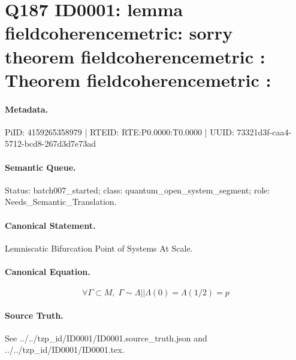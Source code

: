 \section*{Q187 ID0001: lemma fieldcoherencemetric: sorry theorem fieldcoherencemetric : Theorem fieldcoherencemetric :}
\paragraph{Metadata.}
PiID: 4159265358979 | RTEID: RTE:P0.0000:T0.0000 | UUID: 73321d3f-caa4-5712-bcd8-267d3d7e73ad

\paragraph{Semantic Queue.}
Status: batch007\_started; class: quantum\_open\_system\_segment; role: Needs\_Semantic\_Translation.

\paragraph{Canonical Statement.}
Lemniscatic Bifurcation Point of Systems At Scale.

\paragraph{Canonical Equation.}
\[
\forall \Gamma \subset M,\; \Gamma \sim \Lambda || \Lambda(0)=\Lambda(1/2)=p
\]

\paragraph{Source Truth.}
See ../../tzp\_id/ID0001/ID0001.source\_truth.json and ../../tzp\_id/ID0001/ID0001.tex.
